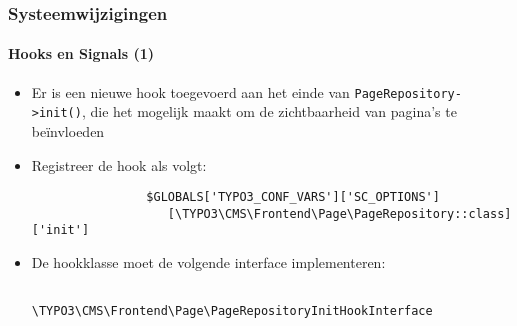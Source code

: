 
\begin{frame}[fragile]
	\frametitle{Systeemwijzigingen}
	\framesubtitle{Hooks en Signals (1)}

	\begin{itemize}

		\item Er is een nieuwe hook toegevoerd aan het einde van \texttt{PageRepository->init()},
			die het mogelijk maakt om de zichtbaarheid van pagina's te beïnvloeden

		\item Registreer de hook als volgt:
			\begin{lstlisting}
				$GLOBALS['TYPO3_CONF_VARS']['SC_OPTIONS']
				   [\TYPO3\CMS\Frontend\Page\PageRepository::class]['init']
			\end{lstlisting}

		\item De hookklasse moet de volgende interface implementeren:
			\begin{lstlisting}
				\TYPO3\CMS\Frontend\Page\PageRepositoryInitHookInterface
			\end{lstlisting}

	\end{itemize}

\end{frame}


